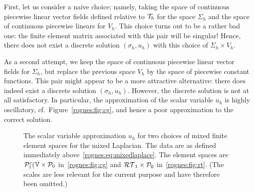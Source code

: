 First, let us consider a naive choice; namely, taking the space of
continuous piecewise linear vector fields defined relative to
$\mathcal{T}_h$ for the space $\Sigma_h$ and the space of continuous
piecewise linears for $V_h$. This choice turns out to be a rather bad
one: the finite element matrix associated with this pair will be
singular! Hence, there does not exist a discrete solution $(\sigma_h,
u_h)$ with this choice of $\Sigma_h \times V_h$.

As a second attempt, we keep the space of continuous piecewise linear
vector fields for $\Sigma_h$, but replace the previous space $V_h$ by
the space of piecewise constant functions. This pair might appear to
be a more attractive alternative: there does indeed exist a discrete
solution $(\sigma_h, u_h)$. However, the discrete solution is not at
all satisfactory. In particular, the approximation of the scalar
variable $u_h$ is highly oscillatory, cf.~Figure~\ref{rognes:fig:cg},
and hence a poor approximation to the correct solution.
\begin{figure}%
  \begin{center}
    \caption{The scalar variable approximation $u_h$ for two choices
      of mixed finite element spaces for the mixed Laplacian. The data
      are as defined immediately above~\eqref{rognes:eq:mixedlaplace}.
      The element spaces are $\mathcal{P}^c_1(\mathbb{V} \times \mathcal{P}_0$
      in~\ref{rognes:fig:cg} and $\mathcal{RT}_1 \times \mathcal{P}_0$
      in~\ref{rognes:fig:rt}. (The scales are less relevant for the
      current purpose and have therefore been omitted.)}
  \end{center}
  \label{rognes:fig:example}
\end{figure}

